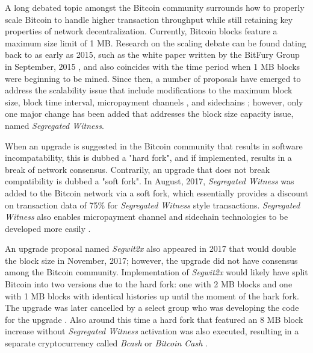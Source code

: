 \documentclass[12pt]{report}
\begin{document}
A long debated topic amongst the Bitcoin community surrounds how to properly scale Bitcoin to handle higher transaction throughput while still retaining key properties of network decentralization. Currently, Bitcoin blocks feature a maximum size limit of 1 MB. Research on the scaling debate can be found dating back to as early as 2015, such as the white paper written by the BitFury Group in September, 2015 \cite{BitFuryGroup.2015}, and also coincides with the time period when 1 MB blocks were beginning to be mined. Since then, a number of proposals have emerged to address the scalability issue that include modifications to the maximum block size, block time interval, micropayment channels \cite{Poon.2016}, and sidechains \cite{Back.2014}; however, only one major change has been added that addresses the block size capacity issue, named \textit{Segregated Witness}. 

When an upgrade is suggested in the Bitcoin community that results in software incompatability, this is dubbed a "hard fork", and if implemented, results in a break of network consensus. Contrarily, an upgrade that does not break compatibility is dubbed a "soft fork". In August, 2017, \textit{Segregated Witness} was added to the Bitcoin network via a soft fork, which essentially provides a discount on transaction data of 75\% for \textit{Segregated Witness} style transactions. \textit{Segregated Witness} also enables micropayment channel and sidechain technologies to be developed more easily \cite{Wuille.2015}.

An upgrade proposal named \textit{Segwit2x} also appeared in 2017 that would double the block size in November, 2017; however, the upgrade did not have consensus among the Bitcoin community. Implementation of \textit{Segwit2x} would likely have split Bitcoin into two versions due to the hard fork: one with 2 MB blocks and one with 1 MB blocks with identical histories up until the moment of the hark fork. The upgrade was later cancelled by a select group who was developing the code for the upgrade \cite{Belshe.2017}. Also around this time a hard fork that featured an 8 MB block increase without \textit{Segregated Witness} activation was also executed, resulting in a separate cryptocurrency called \textit{Bcash} or \textit{Bitcoin Cash} \cite{bitcoincash.org.2017}.
\end{document}
